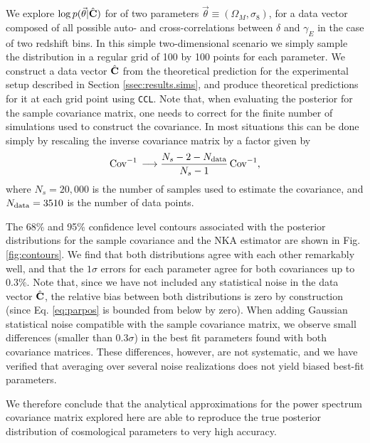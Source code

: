 \documentclass[a4paper,11pt]{article}
\begin{document}
      We explore $\log p(\vec{\theta}|\hat{\bf C})$ for of two parameters $\vec{\theta}\equiv(\Omega_M,\sigma_8)$, for a data vector composed of all possible auto- and cross-correlations between $\delta$ and $\gamma_E$ in the case of two redshift bins. In this simple two-dimensional scenario we simply sample the distribution in a regular grid of 100 by 100 points for each parameter. We construct a data vector $\hat{\bf C}$ from the theoretical prediction for the experimental setup described in Section \ref{ssec:results.sims}, and produce theoretical predictions for it at each grid point using {\tt CCL}. Note that, when evaluating the posterior for the sample covariance matrix, one needs to correct for the finite number of simulations used to construct the covariance. In most situations this can be done simply by rescaling the inverse covariance matrix by a factor  given by \cite{2007A&A...464..399H}
      \begin{equation}\label{eq:hartlap}
        {\rm Cov}^{-1}\,\longrightarrow \frac{N_s-2-N_{\rm data}}{N_s-1}\,{\rm Cov}^{-1},
      \end{equation}
      where $N_s=20,000$ is the number of samples used to estimate the covariance, and $N_{\rm data}=3510$ is the number of data points.
      
      The 68\% and 95\% confidence level contours associated with the posterior distributions for the sample covariance and the NKA estimator are shown in Fig. \ref{fig:contours}. We find that both distributions agree with each other remarkably well, and that the $1\sigma$ errors for each parameter agree for both covariances up to $0.3\%$. Note that, since we have not included any statistical noise in the data vector $\hat{\bf C}$, the relative bias between both distributions is zero by construction (since Eq. \ref{eq:parpos} is bounded from below by zero). When adding Gaussian statistical noise compatible with the sample covariance matrix, we observe small differences (smaller than 0.3$\sigma$) in the best fit parameters found with both covariance matrices. These differences, however, are not systematic, and we have verified that averaging over several noise realizations does not yield biased best-fit parameters.
      
      We therefore conclude that the analytical approximations for the power spectrum covariance matrix explored here are able to reproduce the true posterior distribution of cosmological parameters to very high accuracy.
\end{document}
